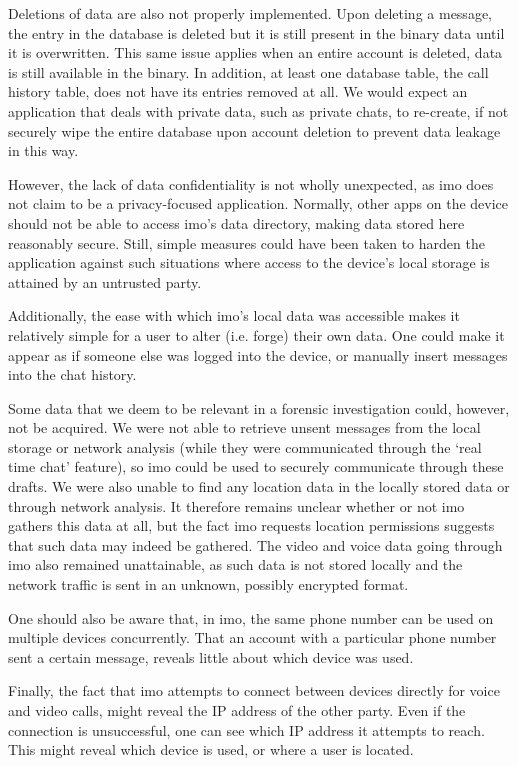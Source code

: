 \documentclass[conference]{IEEEtran}
\begin{document}
Deletions of data are also not properly implemented. Upon deleting a message,
the entry in the database is deleted but it is still present in the binary data
until it is overwritten. This same issue applies when an entire account is
deleted, data is still available in the binary. In addition, at least one
database table, the call history table, does not have its entries removed at
all. We would expect an application that deals with private data, such as
private chats, to re-create, if not securely wipe the entire database upon
account deletion to prevent data leakage in this way.

However, the lack of data confidentiality is not wholly unexpected, as imo does
not claim to be a privacy-focused application. Normally, other apps on the
device should not be able to access imo's data directory, making data stored
here reasonably secure. Still, simple measures could have been taken to harden
the application against such situations where access to the device's local
storage is attained by an untrusted party.

Additionally, the ease with which imo's local data was accessible makes it
relatively simple for a user to alter (i.e. forge) their own data. One could
make it appear as if someone else was logged into the device, or manually insert
messages into the chat history.

Some data that we deem to be relevant in a forensic investigation could,
however, not be acquired. We were not able to retrieve unsent messages from the
local storage or network analysis (while they were communicated through the
`real time chat' feature), so imo could be used to securely communicate through
these drafts. We were also unable to find any location data in the locally
stored data or through network analysis. It therefore remains unclear whether
or not imo gathers this data at all, but the fact imo requests location
permissions suggests that such data may indeed be gathered. The video and voice
data going through imo also remained unattainable, as such data is not stored
locally and the network traffic is sent in an unknown, possibly encrypted
format.

One should also be aware that, in imo, the same phone number can be used on
multiple devices concurrently. That an account with a particular phone number
sent a certain message, reveals little about which device was used.

Finally, the fact that imo attempts to connect between devices directly for
voice and video calls, might reveal the IP address of the other party. Even if
the connection is unsuccessful, one can see which IP address it attempts to
reach. This might reveal which device is used, or where a user is located.
\end{document}
